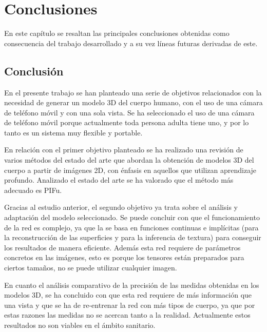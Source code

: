
\chapter{Conclusiones}
\label{conclusiones}
En este capítulo se resaltan las principales conclusiones obtenidas como consecuencia del trabajo desarrollado y a su vez líneas futuras derivadas de este.

\section{Conclusión}

En el presente trabajo se han planteado una serie de objetivos relacionados con la necesidad de generar un modelo 3D del cuerpo humano, con el uso de una cámara de teléfono móvil y con una sola vista. Se ha seleccionado el uso de una cámara de teléfono móvil porque actualmente toda persona adulta tiene uno, y por lo tanto es un sistema muy flexible y portable.

En relación con el primer objetivo planteado se ha realizado una revisión de varios métodos del estado del arte que abordan la obtención de modelos 3D del cuerpo a partir de imágenes 2D, con énfasis en aquellos que utilizan aprendizaje profundo. Analizado el estado del arte se ha valorado que el método más adecuado es PIFu.

Gracias al estudio anterior, el segundo objetivo ya trata sobre el análisis y adaptación del modelo seleccionado. Se puede concluir con que el funcionamiento de la red es complejo, ya que la se basa en funciones continuas e implícitas (para la reconstrucción de las superficies y para la inferencia de textura) para conseguir los resultados de manera eficiente. Además esta red requiere de parámetros concretos en las imágenes, esto es porque los tensores están preparados para ciertos tamaños, no se puede utilizar cualquier imagen. 

En cuanto el análisis comparativo de la precisión de las medidas obtenidas en los modelos 3D, se ha concluido con que esta red requiere de más información que una vista y que se ha de re-entrenar la red con más tipos de cuerpo, ya que por estas razones las medidas no se acercan tanto a la realidad. Actualmente estos resultados no son viables en el ámbito sanitario.


